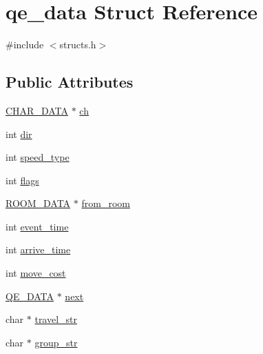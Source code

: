 \hypertarget{structqe__data}{\section{qe\-\_\-data Struct Reference}
\label{structqe__data}
}


{\ttfamily \#include $<$structs.\-h$>$}

\subsection*{Public Attributes}
\begin{DoxyCompactItemize}
\item 
\hyperlink{structs_8h_af33ed1e66e8541a08bed257124f50f31}{C\-H\-A\-R\-\_\-\-D\-A\-T\-A} $\ast$ \hyperlink{structqe__data_a74bace48d10399a7e59335bfc4e25464}{ch}
\item 
int \hyperlink{structqe__data_a8412f8dbe6b830f79005efe3cfc61ef4}{dir}
\item 
int \hyperlink{structqe__data_aa070f528c6714b8ab013d256144affa0}{speed\-\_\-type}
\item 
int \hyperlink{structqe__data_a2584860e1b67ff2a3e390be354807d8a}{flags}
\item 
\hyperlink{room_8h_aede519ef65d80b5242a4a28b69d5e097}{R\-O\-O\-M\-\_\-\-D\-A\-T\-A} $\ast$ \hyperlink{structqe__data_a16f8afbea646659a38b342114635b05b}{from\-\_\-room}
\item 
int \hyperlink{structqe__data_ab42b52d33fe67d2a75ab2f3a7fe1aa31}{event\-\_\-time}
\item 
int \hyperlink{structqe__data_a4b0ea6cfe38ebf3f6c9d4056fb8812e1}{arrive\-\_\-time}
\item 
int \hyperlink{structqe__data_aa0fa1722c4952fd1842d8efd58fd799c}{move\-\_\-cost}
\item 
\hyperlink{structs_8h_a888de2c98dc331eca63dac1c44ba8b8c}{Q\-E\-\_\-\-D\-A\-T\-A} $\ast$ \hyperlink{structqe__data_a6d7a520f4b25f891db6dbecbf27de2c3}{next}
\item 
char $\ast$ \hyperlink{structqe__data_a79634c011f099c5c9f31572fcf60683b}{travel\-\_\-str}
\item 
char $\ast$ \hyperlink{structqe__data_a3ad2455b0ef04aa965c3f33d16814bfc}{group\-\_\-str}
\end{DoxyCompactItemize}


